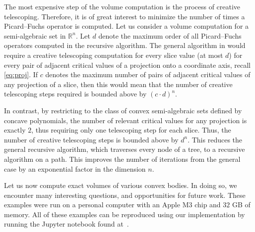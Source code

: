 \documentclass[sigconf, nonacm]{acmart} %
\begin{document}
\vspace{0.3cm}

The most expensive step of the volume computation is the process of creative telescoping. Therefore, it is of great interest to minimize the number of times a Picard--Fuchs operator is computed. Let us consider a volume computation for a semi-algebraic set in $\mathbb R^n$. Let $d$ denote the maximum order of all Picard--Fuchs operators computed in the recursive algorithm. 
The general algorithm in \cite{Lairez_volumes_semi_algebraic_sets} would require a creative telescoping computation for every slice value (at most $d$) for every pair of adjacent critical values of a projection onto a coordinate axis, recall \eqref{eq:proj}. If $c$ denotes the maximum number of pairs of adjacent critical values of any projection of a slice, then this would mean that the number of creative telescoping steps required is bounded above by $(c \cdot d)^n$. 

In contrast, by restricting to the class of convex semi-algebraic sets defined by concave polynomials, the number of relevant critical values for any projection is exactly $2$, thus requiring only one telescoping step for each slice. Thus, the number of creative telescoping steps is bounded above by $d^n$. 
This reduces the general recursive algorithm, which traverses every node of a tree, to a recursive algorithm on a path. This improves the number of iterations from the general case by an exponential factor in the dimension $n$. 

\vspace{0.3cm}

Let us now compute exact volumes of various convex bodies. In doing so, we encounter many interesting questions, and opportunities for future work. These examples were run on a personal computer with an Apple M3 chip and $32$ GB of memory. All of these examples can be reproduced using our implementation by running the Jupyter notebook found at~\cite{implementation}.
\end{document}
